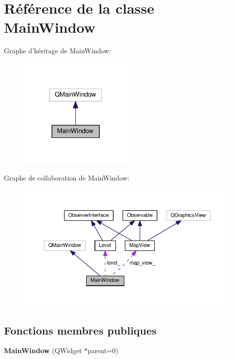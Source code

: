 \hypertarget{classMainWindow}{\section{Référence de la classe Main\+Window}
\label{classMainWindow}
}


Graphe d'héritage de Main\+Window\+:
\nopagebreak
\begin{figure}[H]
\begin{center}
\leavevmode
\includegraphics[width=160pt]{d1/d96/classMainWindow__inherit__graph}
\end{center}
\end{figure}


Graphe de collaboration de Main\+Window\+:
\nopagebreak
\begin{figure}[H]
\begin{center}
\leavevmode
\includegraphics[width=350pt]{d2/d38/classMainWindow__coll__graph}
\end{center}
\end{figure}
\subsection*{Fonctions membres publiques}
\begin{DoxyCompactItemize}
\item 
\hypertarget{classMainWindow_a8b244be8b7b7db1b08de2a2acb9409db}{{\bfseries Main\+Window} (Q\+Widget $\ast$parent=0)}\label{classMainWindow_a8b244be8b7b7db1b08de2a2acb9409db}

\end{DoxyCompactItemize}
